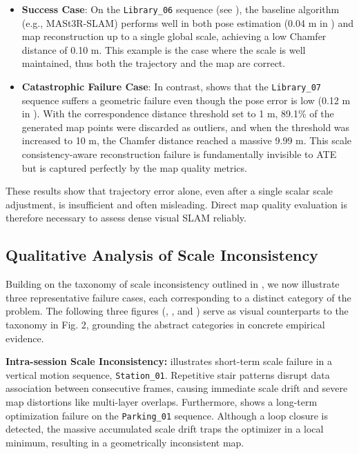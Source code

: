 \begin{itemize}
  \item \textbf{Success Case}:
  On the \texttt{Library\_06} sequence (see ), the baseline algorithm (e.g., MASt3R-SLAM) performs well in both pose estimation (0.04 m in ) and map reconstruction up to a single global scale, achieving a low Chamfer distance of 0.10 m. This example is the case where the scale is well maintained, thus both the trajectory and the map are correct.

  \item \textbf{Catastrophic Failure Case}: 
  In contrast,  shows that the \texttt{Library\_07} sequence suffers a geometric failure even though the pose error is low (0.12 m in ). With the correspondence distance threshold set to 1 m, 89.1\% of the generated map points were discarded as outliers, and when the threshold was increased to 10 m, the Chamfer distance reached a massive 9.99 m. This scale consistency-aware reconstruction failure is fundamentally invisible to ATE but is captured perfectly by the map quality metrics.  
\end{itemize}
These results show that trajectory error alone, even after a single scalar scale adjustment, is insufficient and often misleading. Direct map quality evaluation is therefore necessary to assess dense visual SLAM reliably.

% 
\subsection{Qualitative Analysis of Scale Inconsistency}
\label{sec:exp_qual}

Building on the taxonomy of scale inconsistency outlined in , we now illustrate three representative failure cases, each corresponding to a distinct category of the problem. The following three figures (, , and )  serve as visual counterparts to the taxonomy in Fig. 2, grounding the abstract categories in concrete empirical evidence.

\noindent \textbf{Intra-session Scale Inconsistency:}  illustrates short-term scale failure in a vertical motion sequence, \texttt{Station\_01}. Repetitive stair patterns disrupt data association between consecutive frames, causing immediate scale drift and severe map distortions like multi-layer overlaps. Furthermore,  shows a long-term optimization failure on the \texttt{Parking\_01} sequence. Although a loop closure is detected, the massive accumulated scale drift traps the optimizer in a local minimum, resulting in a geometrically inconsistent map.

